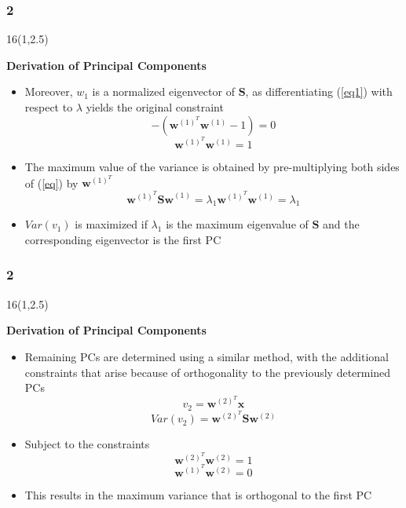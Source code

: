 \documentclass{beamer}
\newcommand\FrameText[1]{
\begin{textblock}{16}(1,2.5)
\raggedright #1
\end{textblock}}
\begin{document}
\begin{frame}
\frametitle{2}
\FrameText{\bf{\large Derivation of Principal Components}}
\begin{itemize}
\item Moreover, $w_1$ is a normalized eigenvector of $\mathbf{S}$, as differentiating (\ref{eq1}) with respect to $\lambda$ yields the original constraint
\begin{equation}
-(\mathbf{w}^{(1)^{T}}\mathbf{w}^{(1)}-1)=0
\end{equation}
\begin{equation}
\mathbf{w}^{(1)^{T}}\mathbf{w}^{(1)}=1
\end{equation}
\item The maximum value of the variance is obtained by pre-multiplying both sides of (\ref{eq}) by $\mathbf{w}^{(1)^{T}}$
\begin{equation}
\mathbf{w}^{(1)^{T}}\mathbf{Sw}^{(1)}=\lambda_1\mathbf{w}^{(1)^{T}}\mathbf{w}^{(1)}=\lambda_1
\end{equation}
\item $Var(v_1)$ is maximized if $\lambda_1$ is the maximum eigenvalue of $\mathbf{S}$ and the corresponding eigenvector is the first PC
\end{itemize}
\end{frame}

\begin{frame}
\frametitle{2}
\FrameText{\bf{\large Derivation of Principal Components}}
\begin{itemize}
\item Remaining PCs are determined using a similar method, with the additional constraints that arise because of orthogonality to the previously determined PCs
\begin{equation}
v_2=\mathbf{w}^{(2)^{T}}\mathbf{x}
\end{equation}
\begin{equation}
Var(v_2)=\mathbf{w}^{(2)^{T}}\mathbf{S}\mathbf{w}^{(2)}
\end{equation}
\item Subject to the constraints
\begin{equation}
\mathbf{w}^{(2)^{T}}\mathbf{w}^{(2)}=1
\end{equation}
\begin{equation}
\mathbf{w}^{(1)^{T}}\mathbf{w}^{(2)}=0
\end{equation}
\item This results in the maximum variance that is orthogonal to the first PC
\end{itemize}
\end{frame}
\end{document}
